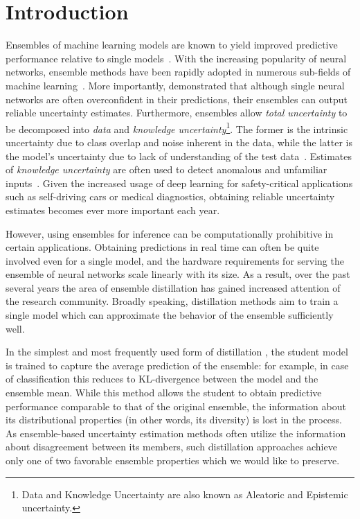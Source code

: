 \section{Introduction}
\label{sec:introduction}



Ensembles of machine learning models are known to yield improved predictive performance relative to single models~\cite{dietterich2000ensemble}. With the increasing popularity of neural networks, ensemble methods have been rapidly adopted in numerous sub-fields of machine learning~\cite{ashukha2020pitfalls, trust-uncertainty}. More importantly, \cite{deepensemble2017} demonstrated that although single neural networks are often overconfident in their predictions, their ensembles can output reliable uncertainty estimates. Furthermore, ensembles allow \emph{total uncertainty} to be decomposed into \emph{data} and \emph{knowledge uncertainty}\footnote{Data and Knowledge Uncertainty are also known as Aleatoric and Epistemic uncertainty.}. The former is the intrinsic uncertainty due to class overlap and noise inherent in the data, while the latter is the model's uncertainty due to lack of understanding of the test data~\cite{malinin-thesis}. Estimates of \emph{knowledge uncertainty} are often used to detect anomalous and unfamiliar inputs~\cite{batchbald,gal-adversarial, malinin-rkl-2019, malinin-thesis}. Given the increased usage of deep learning for safety-critical applications such as self-driving cars or medical diagnostics, obtaining reliable uncertainty estimates becomes ever more important each year.

However, using ensembles for inference can be computationally prohibitive in certain applications. Obtaining predictions in real time can often be quite involved even for a single model, and the hardware requirements for serving the ensemble of neural networks scale linearly with its size. As a result, over the past several years the area of ensemble distillation has gained increased attention of the research community. Broadly speaking, distillation methods aim to train a single model which can approximate the behavior of the ensemble sufficiently well. 

In the simplest and most frequently used form of distillation \cite{hinton2015distilling}, the student model is trained to capture the average prediction of the ensemble: for example, in case of classification this reduces to KL-divergence between the model and the ensemble mean. While this method allows the student to obtain predictive performance comparable to that of the original ensemble, the information about its distributional properties (in other words, its diversity) is lost in the process. As ensemble-based uncertainty estimation methods often utilize the information about disagreement between its members, such distillation approaches achieve only one of two favorable ensemble properties which we would like to preserve.

